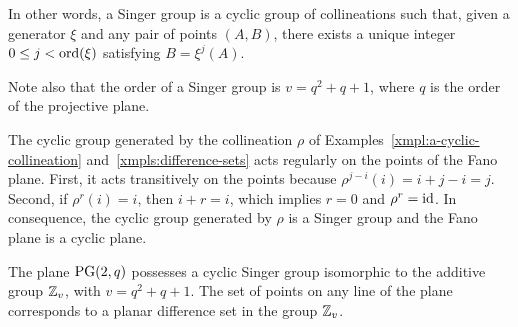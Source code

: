 \begin{rem}
    In other words, a Singer group is a cyclic group of collineations such that, given a generator $\xi$ and any pair of points $(A,B)$, there exists a unique integer $0 \le j < \operatorname{ord}(\xi)$ satisfying $B = \xi^j(A)$.
    
    Note also that the order of a Singer group is $v=q^2+q+1$, where $q$ is the order of the projective plane.
\end{rem}

\begin{xmpl}
    The cyclic group generated by the collineation $\rho$ of Examples~\ref{xmpl:a-cyclic-collineation} and~\ref{xmpls:difference-sets} acts regularly on the points of the Fano plane. First, it acts transitively on the points because $\rho^{j-i}(i)=i+j-i=j$. Second, if $\rho^r(i)=i$, then $i+r=i$, which implies $r=0$ and $\rho^r=\operatorname{id}$. In consequence, the cyclic group generated by $\rho$ is a Singer group and the Fano plane is a cyclic plane.
\end{xmpl}

\begin{thm}
    The plane\/ $\operatorname{PG}(2,q)$ possesses a cyclic Singer group isomorphic to the additive group\/ $\mathbb{Z}_v$, with $v=q^2+q+1$. The set of points on any line of the plane corresponds to a planar difference set in the group\/ $\mathbb{Z}_v$.
\end{thm}

